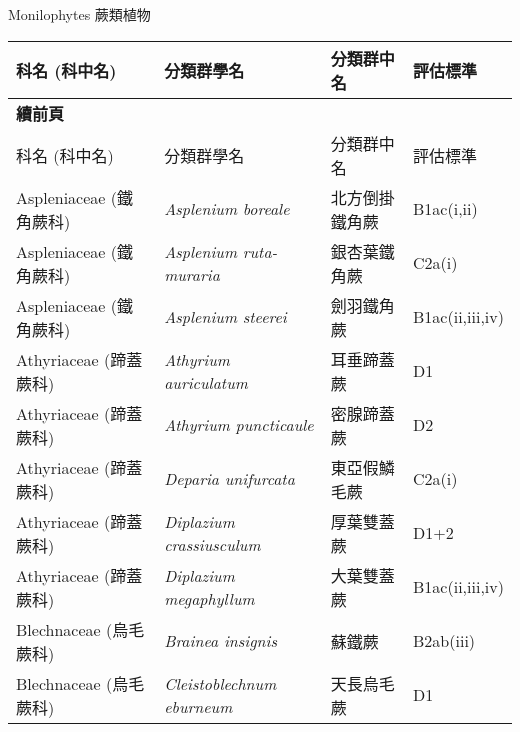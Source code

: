 \noindent\normalfont\selectfont Monilophytes 蕨類植物
\footnotesize\selectfont
        \begin{longtable}{p{3cm}p{5cm}p{3cm}p{4cm}}
        \toprule
          科名 (科中名) & 分類群學名 & 分類群中名 & 評估標準 \\
        \midrule 
        \endfirsthead

        {{\bfseries 續前頁 }} \\
        科名 (科中名) & 分類群學名 & 分類群中名 & 評估標準 \\
        \midrule
        \endhead
                Aspleniaceae (鐵角蕨科) & \textit{Asplenium boreale}  & 北方倒掛鐵角蕨 & B1ac(i,ii) \index{Asplenium@\textit{Asplenium}!boreale@\textit{boreale}}  \index{北方倒掛鐵角蕨} \\
    Aspleniaceae (鐵角蕨科) & \textit{Asplenium ruta-muraria}  & 銀杏葉鐵角蕨 & C2a(i) \index{Asplenium@\textit{Asplenium}!ruta-muraria@\textit{ruta-muraria}}  \index{銀杏葉鐵角蕨} \\
    Aspleniaceae (鐵角蕨科) & \textit{Asplenium steerei}  & 劍羽鐵角蕨 & B1ac(ii,iii,iv) \index{Asplenium@\textit{Asplenium}!steerei@\textit{steerei}}  \index{劍羽鐵角蕨} \\
    Athyriaceae (蹄蓋蕨科) & \textit{Athyrium auriculatum}  & 耳垂蹄蓋蕨 & D1 \index{Athyrium@\textit{Athyrium}!auriculatum@\textit{auriculatum}}  \index{耳垂蹄蓋蕨} \\
    Athyriaceae (蹄蓋蕨科) & \textit{Athyrium puncticaule}  & 密腺蹄蓋蕨 & D2 \index{Athyrium@\textit{Athyrium}!puncticaule@\textit{puncticaule}}  \index{密腺蹄蓋蕨} \\
    Athyriaceae (蹄蓋蕨科) & \textit{Deparia unifurcata}  & 東亞假鱗毛蕨 & C2a(i) \index{Deparia@\textit{Deparia}!unifurcata@\textit{unifurcata}}  \index{東亞假鱗毛蕨} \\
    Athyriaceae (蹄蓋蕨科) & \textit{Diplazium crassiusculum}  & 厚葉雙蓋蕨 & D1+2 \index{Diplazium@\textit{Diplazium}!crassiusculum@\textit{crassiusculum}}  \index{厚葉雙蓋蕨} \\
    Athyriaceae (蹄蓋蕨科) & \textit{Diplazium megaphyllum}  & 大葉雙蓋蕨 & B1ac(ii,iii,iv) \index{Diplazium@\textit{Diplazium}!megaphyllum@\textit{megaphyllum}}  \index{大葉雙蓋蕨} \\
    Blechnaceae (烏毛蕨科) & \textit{Brainea insignis}  & 蘇鐵蕨 & B2ab(iii) \index{Brainea@\textit{Brainea}!insignis@\textit{insignis}}  \index{蘇鐵蕨} \\
    Blechnaceae (烏毛蕨科) & \textit{Cleistoblechnum eburneum}  & 天長烏毛蕨 & D1 \index{Cleistoblechnum@\textit{Cleistoblechnum}!eburneum@\textit{eburneum}}  \index{天長烏毛蕨} \\

\end{longtable}
